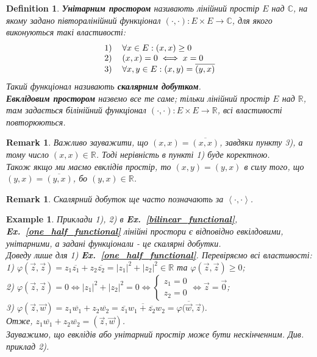 \documentclass[a4paper, 10pt]{article}
\theoremstyle{theoremdd}
\newtheorem{definition}[theorem]{Definition}
\newtheorem{example}[theorem]{Example}
\newtheorem{remark}[theorem]{Remark}
\newcommand\exref[1]{\textbf{Ex.~\ref{#1}}}
\begin{document}
\begin{definition}
\textbf{Унітарним простором} називають лінійний простір $E$ над $\mathbb{C}$, на якому задано півторалінійний функціонал $(\cdot, \cdot) \colon E \times E \to \mathbb{C}$, для якого виконуються такі властивості:
\begin{align*}
\begin{tabular}{cl}
1) & $\forall x \in E: (x, x) \geq 0$\\
2) & $(x, x) = 0 \iff x = 0$\\
3) & $\forall x,y \in E: (x, y) = \overline{(y, x)}$
\end{tabular}
\end{align*}
Такий функціонал називають \textbf{скалярним добутком}.
\bigskip \\
\textbf{Евклідовим простором} назвемо все те саме; тільки лінійний простір $E$ над $\mathbb{R}$, там задається білінійний функціонал $(\cdot, \cdot) \colon E \times E \to \mathbb{R}$, всі властивості повторюються.
\end{definition}

\begin{remark}
Важливо зауважити, що $(x,x) = \overline{(x,x)}$, завдяки пункту 3), а тому число $(x,x) \in \mathbb{R}$. Тоді нерівність в пункті 1) буде коректною.\\
Також якщо ми маємо евклідів простір, то $(x,y) = (y,x)$ в силу того, що $(y,x) = \overline{(y,x)}$, бо $(y,x) \in \mathbb{R}$.
\end{remark}

\begin{remark}
Скалярний добуток ще часто позначають за $\left< \cdot, \cdot \right>$.
\end{remark}

\begin{example}
Приклади 1), 2) в \exref{bilinear_functional}, \exref{one_half_functional} лінійні простори є відповідно евкілдовими, унітарними, а задані функціонали - це скалярні добутки.\\
Доведу лише для 1) \exref{one_half_functional}. Перевіряємо всі властивості:\\
1) $\varphi(\vec{z},\vec{z}) = z_1 \overline{z_1} + z_2 \overline{z_2} = |z_1|^2 + |z_2|^2 \in \mathbb{R}$ та $\varphi(\vec{z},\vec{z}) \geq 0$;\\
2) $\varphi(\vec{z},\vec{z}) = 0 \iff |z_1|^2 + |z_2|^2 = 0 \iff \begin{cases} z_1 = 0 \\ z_2 = 0 \end{cases} \iff \vec{z} = \vec{0}$;\\
3) $\varphi(\vec{z},\vec{w}) = z_1 \overline{w_1} + z_2 \overline{w_2} = \overline{\overline{z_1} w_1 + \overline{z_2} w_2} = \overline{\varphi(\vec{w},\vec{z}})$.\\
Отже, $z_1 \overline{w_1} + z_2 \overline{w_2} = (\vec{z},\vec{w})$.
\bigskip \\
Зауважимо, що евклідів або унітарний простір може бути нескінченним. Див. приклад 2).
\end{example}
\end{document}
